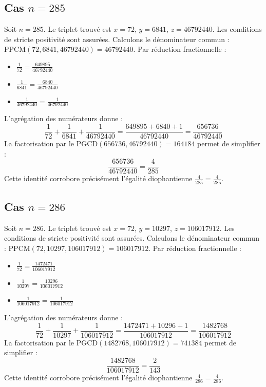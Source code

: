 \documentclass[11pt,a4paper]{article}
\begin{document}
\subsection{Cas $n = 285$}
Soit $n = 285$. Le triplet trouvé est $x = 72$, $y = 6841$, $z = 46792440$.
Les conditions de stricte positivité sont assurées.
Calculons le dénominateur commun : $\text{PPCM}(72, 6841, 46792440) = 46792440$.
Par réduction fractionnelle :
\begin{itemize}
    \item $\frac{1}{72} = \frac{649895}{46792440}$
    \item $\frac{1}{6841} = \frac{6840}{46792440}$
    \item $\frac{1}{46792440} = \frac{1}{46792440}$
\end{itemize}
L'agrégation des numérateurs donne :
$$ \frac{1}{72} + \frac{1}{6841} + \frac{1}{46792440} = \frac{649895 + 6840 + 1}{46792440} = \frac{656736}{46792440} $$
La factorisation par le $\text{PGCD}(656736, 46792440) = 164184$ permet de simplifier :
$$ \frac{656736}{46792440} = \frac{4}{285} $$
Cette identité corrobore précisément l'égalité diophantienne $\frac{4}{285} = \frac{4}{285}$.

\subsection{Cas $n = 286$}
Soit $n = 286$. Le triplet trouvé est $x = 72$, $y = 10297$, $z = 106017912$.
Les conditions de stricte positivité sont assurées.
Calculons le dénominateur commun : $\text{PPCM}(72, 10297, 106017912) = 106017912$.
Par réduction fractionnelle :
\begin{itemize}
    \item $\frac{1}{72} = \frac{1472471}{106017912}$
    \item $\frac{1}{10297} = \frac{10296}{106017912}$
    \item $\frac{1}{106017912} = \frac{1}{106017912}$
\end{itemize}
L'agrégation des numérateurs donne :
$$ \frac{1}{72} + \frac{1}{10297} + \frac{1}{106017912} = \frac{1472471 + 10296 + 1}{106017912} = \frac{1482768}{106017912} $$
La factorisation par le $\text{PGCD}(1482768, 106017912) = 741384$ permet de simplifier :
$$ \frac{1482768}{106017912} = \frac{2}{143} $$
Cette identité corrobore précisément l'égalité diophantienne $\frac{4}{286} = \frac{4}{286}$.
\end{document}
